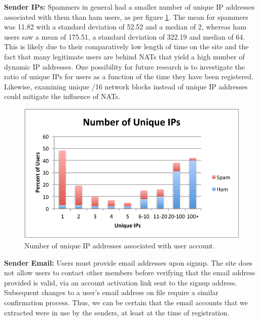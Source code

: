 \documentclass[preprint]{acm_proc_article-sp}
\begin{document}
\textbf{Sender IPs:} Spammers in general had a smaller number of unique IP addresses associated with them than ham users, as per figure \ref{fig:uniqip}. The mean for spammers was 11.82 with a standard deviation of 52.52 and a median of 2, whereas ham users saw a mean of 175.51, a standard deviation of 322.19 and median of 64. This is likely due to their comparatively low length of time on the site and the fact that many legitimate users are behind NATs that yield a high number of dynamic IP addresses. One possibility for future research is to investigate the ratio of unique IPs for users as a function of the time they have been registered. Likewise, examining unique /16 network blocks instead of unique IP addresses could mitigate the influence of NATs.

\begin{figure}[h]
    \centering
    \includegraphics[width=\linewidth]{figures/unique-ips.pdf}
    \caption{Number of unique IP addresses associated with user account.}
    \label{fig:uniqip}
\end{figure}

\textbf{Sender Email:} Users must provide email addresses upon signup. The site does not allow users to contact other 
members before verifying that the email address provided is valid, via an account activation link sent to the signup 
address. Subsequent changes to a user's email address on file require a similar confirmation process. Thus, we can be certain 
that the email accounts that we extracted were in use by the senders, at least at the time of registration. 
\end{document}

